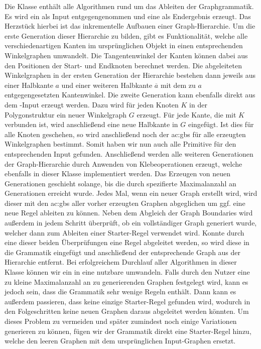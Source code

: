 Die  Klasse enthält alle Algorithmen rund um das Ableiten der Graphgrammatik. Es wird ein  als
Input entgegengenommen und eine  als Endergebnis erzeugt. Das Herzstück hierbei ist das inkrementelle Aufbauen einer
Graph-Hierarchie. Um die erste Generation dieser Hierarchie zu bilden, gibt es Funktionalität, welche alle verschiedenartigen
Kanten im ursprünglichen  Objekt in einen entsprechenden Winkelgraphen umwandelt. Die Tangentenwinkel der Kanten
können dabei aus den Positionen der Start- und Endknoten berechnet werden. Die abgeleiteten Winkelgraphen in der ersten Generation der
Hierarchie bestehen dann jeweils aus einer Halbkante \(a\) und einer weiteren Halbkante \(\overline{a}\) mit dem zu \(a\) entgegengesetzten
Kantenwinkel. Die zweite Generation kann ebenfalls direkt aus dem -Input erzeugt werden. Dazu wird für jeden Knoten \(K\)
in der Polygonstruktur ein neuer Winkelgraph \(G\) erzeugt. Für jede Kante, die mit \(K\) verbunden ist, wird anschließend eine neue
Halbkante in \(G\) eingefügt. Ist dies für alle Knoten geschehen, so wird anschließend noch der \gls{ac:gbs} für alle erzeugten
Winkelgraphen bestimmt. Somit haben wir nun auch alle Primitive für den entsprechenden Input gefunden. Anschließend werden alle weiteren
Generationen der Graph-Hierarchie durch Anwenden von Klebeoperationen erzeugt, welche ebenfalls in dieser Klasse implementiert werden.
Das Erzeugen von neuen Generationen geschieht solange, bis die durch  spezifierte Maximalanzahl an Generationen erreicht
wurde. Jedes Mal, wenn ein neuer Graph erstellt wird, wird dieser mit den \gls{ac:gbs} aller vorher erzeugten Graphen abgeglichen um ggf.
eine neue Regel ableiten zu können. Neben dem Abgleich der Graph Boundaries
wird außerdem in jedem Schritt überprüft, ob ein vollständiger Graph generiert wurde, welcher dann zum Ableiten einer Starter-Regel
verwendet wird. Konnte durch eine dieser beiden Überprüfungen eine Regel abgeleitet werden, so wird diese in die Grammatik eingefügt
und anschließend der entsprechende Graph aus der Hierarchie entfernt. Bei erfolgreichem Durchlauf aller Algorithmen in dieser Klasse
können wir ein  in eine nutzbare  umwandeln. Falls durch den Nutzer eine zu kleine Maximalanzahl
an zu generierenden Graphen festgelegt wird, kann es jedoch sein, dass die Grammatik sehr wenige Regeln enthält. Dann kann es außerdem
passieren, dass keine einzige Starter-Regel gefunden wird, wodurch in den Folgeschritten keine neuen Graphen daraus abgeleitet werden
könnten. Um dieses Problem zu vermeiden und später zumindest noch einige Variationen generieren zu können, fügen wir der Grammatik
direkt eine Starter-Regel hinzu, welche den leeren Graphen mit dem ursprünglichen Input-Graphen ersetzt.

